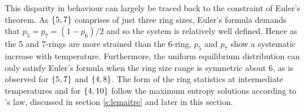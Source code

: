 This disparity in behaviour can largely be traced back to the constraint of Euler's theorem. 
As $\left\{5,7\right\}$ comprises of just three ring sizes, Euler's formula demands that $p_5=p_7=\left(1-p_6\right)/2$ and so the system is relatively well defined. 
Hence as the 5 and 7-rings are more strained than the 6-ring, $p_5$ and $p_7$ show a systematic increase with temperature. 
Furthermore, the uniform equilibrium distribution can only satisfy Euler's formula when the ring size range is symmetric about 6, as is observed for $\left\{5,7\right\}$ and $\left\{4,8\right\}$. 
The form of the ring statistics at intermediate temperatures and for $\left\{4,10\right\}$ follow the maximum entropy solutions according to \lm's law, discussed in section \ref{s:lemaitre} and later in this section.

\begin{figure}[bt]
     \centering
     

\end{figure}
